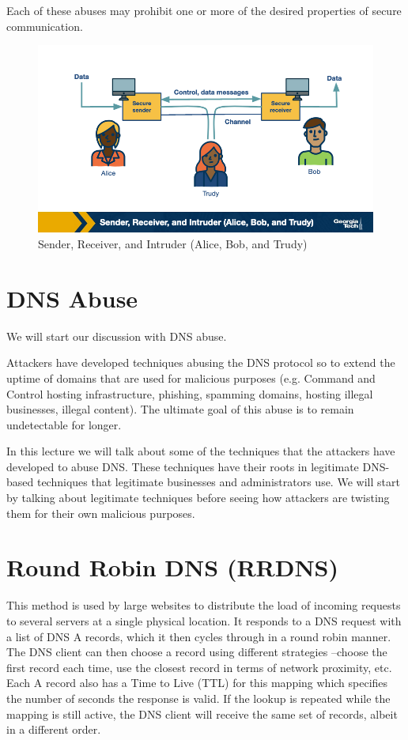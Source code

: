 \documentclass[11pt]{article}
\begin{document}
Each of these abuses may prohibit one or more of the desired properties of secure communication. 

\begin{figure}[htbp]
\centering
\includegraphics[width=.9\linewidth]{./MD_Figures/9_properties_secure_comm_1.png}
\caption{\label{fig:org399970c}Sender, Receiver, and Intruder (Alice, Bob, and Trudy)}
\end{figure}



\section{DNS Abuse}
\label{sec:org521f7a2}

We will start our discussion with DNS abuse.

Attackers have developed techniques abusing the DNS protocol so to extend the uptime of domains that are used for malicious purposes (e.g. Command and Control hosting infrastructure, phishing, spamming domains, hosting illegal businesses, illegal content). The ultimate goal of this abuse is to remain undetectable for longer.

In this lecture we will talk about some of the techniques that the attackers have developed to abuse DNS. These techniques have their roots in legitimate DNS-based techniques that legitimate businesses and administrators use. We will start by talking about legitimate techniques before seeing how attackers are twisting them for their own malicious purposes.

\section{Round Robin DNS (RRDNS)}
\label{sec:orgb6ea00b}

This method is used by large websites to distribute the load of incoming requests to several servers at a single physical location. It responds to a DNS request with a list of DNS A records, which it then cycles through in a round robin manner. The DNS client can then choose a record using different strategies –choose the first record each time, use the closest record in terms of network proximity, etc. Each A record also has a Time to Live (TTL) for this mapping which specifies the number of seconds the response is valid. If the lookup is repeated while the mapping is still active, the DNS client will receive the same set of records, albeit in a different order.
\end{document}
